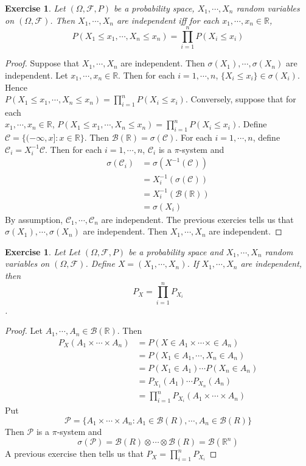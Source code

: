 \documentclass[12pt]{amsart}
\newtheorem{ex}[thm]{Exercise}
\newcommand{\sig}{\sigma}
\newcommand{\Om}{\Omega}
\newcommand{\R}{\mathbb{R}}
\newcommand{\MC}{\mathcal{C}}
\newcommand{\MB}{\mathcal{B}}
\newcommand{\MF}{\mathcal{F}}
\newcommand{\MP}{\mathcal{P}}
\begin{document}
\begin{ex}
Let $(\Om, \MF, P)$ be a probability space, $X_1, \cdots, X_n$ random variables on $(\Om, \MF)$. Then $X_1, \cdots, X_n$ are independent iff for each $x_1, \cdots, x_n \in \R$, $$P(X_1 \leq x_1, \cdots, X_n \leq x_n ) = \prod_{i=1}^nP(X_i \leq x_i)$$
\end{ex}

\begin{proof}
Suppose that $X_1, \cdots, X_n$ are independent. Then $\sig(X_1), \cdots, \sig(X_n)$ are independent. Let $x_1, \cdots, x_n \in \R$. Then for each $i=1, \cdots, n$, $\{X_i \leq x_i\} \in \sigma(X_i)$. Hence \\$P(X_1 \leq x_1, \cdots, X_n \leq x_n ) = \prod\limits_{i=1}^nP(X_i \leq x_i)$. Conversely, suppose that for each \\$x_1, \cdots, x_n \in \R$, $P(X_1 \leq x_1, \cdots, X_n \leq x_n ) = \prod\limits_{i=1}^nP(X_i \leq x_i)$. Define $\MC = \{ (-\infty, x]: x \in \R \}$. Then $\MB(\R) = \sig(\MC)$. For each $i =1, \cdots, n$, define $\MC_i = X_i^{-1}\MC$. Then for each $i =1, \cdots, n$, $\MC_i$ is a $\pi$-system and 
\begin{align*}
\sig(\MC_i) 
&= \sig(X^{-1}(\MC)) \\
&= X_i^{-1}(\sig(\MC)) \\
&= X_i^{-1}(\MB(\R)) \\
&= \sig(X_i)
\end{align*}
By assumption, $\MC_1, \cdots, \MC_n$ are independent. The previous exercies tells us that $\sig(X_1), \cdots, \sig(X_n)$ are independent. Then $X_1, \cdots, X_n$ are independent. 
\end{proof}

\begin{ex}
Let Let $(\Om, \MF, P)$ be a probability space and $X_1, \cdots, X_n$ random variables on $(\Om, \MF)$. Define $X = (X_1, \cdots, X_n)$. If $X_1, \cdots, X_n$ are independent, then $$P_{X} = \prod\limits_{i=1}^nP_{X_i}$$.
\end{ex}

\begin{proof}
Let $A_1, \cdots, A_n \in \MB(\R)$. Then 
\begin{align*}
P_X(A_1 \times \cdots \times A_n) 
&= P(X \in A_1 \times \cdots \times \in A_n)\\
&= P(X_1 \in A_1, \cdots, X_n \in A_n) \\
&= P(X_1 \in A_1) \cdots P(X_n \in A_n) \\
&= P_{X_1}(A_1) \cdots P_{X_n}(A_n) \\
&= \prod_{i=1}^nP_{X_i}(A_1 \times \cdots \times  A_n)
\end{align*}
Put $$\MP = \{ A_1 \times \cdots \times A_n: A_1 \in \MB(R), \cdots, A_n \in \MB(R) \}$$ Then $\MP$ is a $\pi$-system and $$\sig(\MP) = \MB(R) \otimes \cdots \otimes \MB(R) = \MB(\R^n)$$
A previous exercise then tells us that $P_X = \prod\limits_{i=1}^nP_{X_i}$ 
\end{proof}
\end{document}
